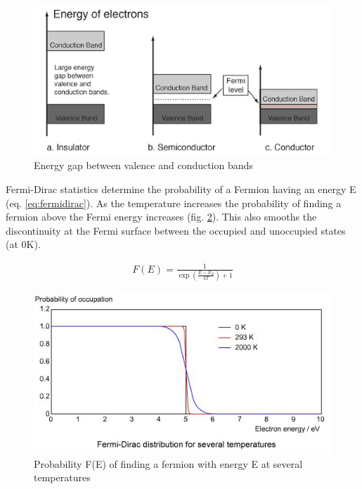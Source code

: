 \begin{figure}
\centering
\begin{minipage}{.65\textwidth}
\centering
    \includegraphics[width=.7\linewidth]{chapters/background_potential_fitting/images/energy-bands-hyperphysics.png}
    \caption{Energy gap between valence and conduction bands\cite{bandgapshyperphysics}}
    \label{fig:bandgapshyperphysics}
\end{minipage}
\end{figure}

Fermi-Dirac statistics determine the probability of a Fermion having an energy E (eq. \ref{eq:fermidirac}).  As the temperature increases the probability of finding a fermion above the Fermi energy increases (fig. \ref{fig:fermidiracdist}).  This also smooths the discontinuity at the Fermi surface between the occupied and unoccupied states (at 0K). 

\begin{equation}
\begin{split}
F(E) = \frac{1}{\exp(\frac{E - E_F}{kT}) + 1}
\end{split}
\label{eq:fermidirac}
\end{equation}

\begin{figure}
\centering
\begin{minipage}{.65\textwidth}
\centering
    \includegraphics[width=.7\linewidth]{chapters/background_potential_fitting/images/fermiDirac.jpg}
    \caption{Probability F(E) of finding a fermion with energy E at several temperatures\cite{fermidiracdist}}
    \label{fig:fermidiracdist}
\end{minipage}
\end{figure}

